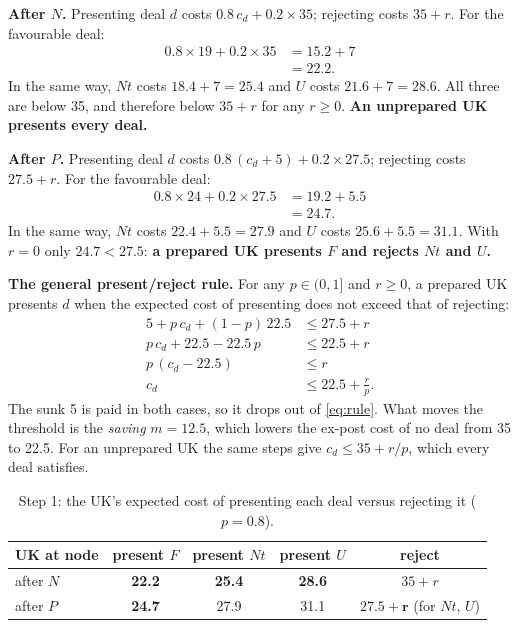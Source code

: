 \documentclass[11pt,a4paper]{article}
\newcommand{\Nt}{\mathit{Nt}}
\newcommand{\dF}{\mathit{F}}
\newcommand{\dU}{\mathit{U}}
\begin{document}
\textbf{After $N$.} Presenting deal $d$ costs $0.8\,c_d+0.2\times35$; rejecting costs $35+r$.
For the favourable deal:
\begin{align*}
  0.8\times19+0.2\times35 &= 15.2+7\\
                          &= 22.2 .
\end{align*}
In the same way, $\Nt$ costs $18.4+7=25.4$ and $\dU$ costs $21.6+7=28.6$. All three are below 35, and
therefore below $35+r$ for any $r\ge0$. \textbf{An unprepared UK presents every deal.}

\textbf{After $P$.} Presenting deal $d$ costs $0.8\,(c_d+5)+0.2\times27.5$; rejecting costs
$27.5+r$. For the favourable deal:
\begin{align*}
  0.8\times24+0.2\times27.5 &= 19.2+5.5\\
                            &= 24.7 .
\end{align*}
In the same way, $\Nt$ costs $22.4+5.5=27.9$ and $\dU$ costs $25.6+5.5=31.1$. With $r=0$ only $24.7<27.5$:
\textbf{a prepared UK presents $\dF$ and rejects $\Nt$ and $\dU$.}

\textbf{The general present/reject rule.} For any $p\in(0,1]$ and $r\ge0$, a prepared UK
presents $d$ when the expected cost of presenting does not exceed that of rejecting:
\begin{align}
  5+p\,c_d+(1-p)\,22.5 &\le 27.5+r \nonumber\\
  p\,c_d+22.5-22.5\,p &\le 22.5+r \nonumber\\
  p\,(c_d-22.5) &\le r \nonumber\\
  c_d &\le 22.5+\frac{r}{p}. \label{eq:rule}
\end{align}
The sunk 5 is paid in both cases, so it drops out of \eqref{eq:rule}. What moves the threshold is the
\emph{saving} $m=12.5$, which lowers the ex-post cost of no deal from 35 to 22.5. For an
unprepared UK the same steps give $c_d\le35+r/p$, which every deal satisfies.

\begin{table}[h]
\centering
\caption{Step 1: the UK's expected cost of presenting each deal versus rejecting it ($p=0.8$).}
\begin{tabular}{lcccc}
\toprule
UK at node & present $\dF$ & present $\Nt$ & present $\dU$ & reject \\
\midrule
after $N$ & \textbf{22.2} & \textbf{25.4} & \textbf{28.6} & $35+r$ \\
after $P$ & \textbf{24.7} & 27.9 & 31.1 & $\mathbf{27.5+r}$ (for $\Nt$, $\dU$) \\
\bottomrule
\end{tabular}
\end{table}
\end{document}
